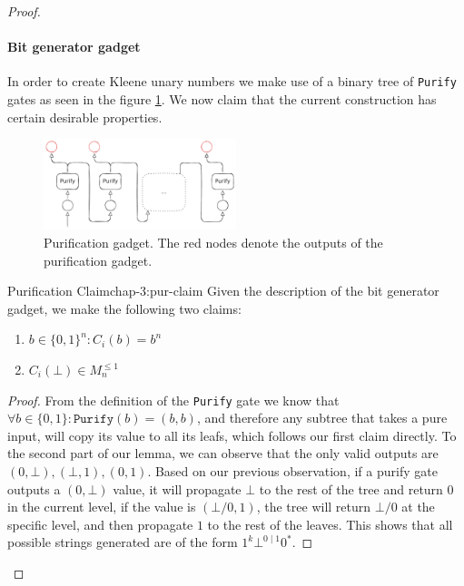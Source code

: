 \begin{proof}
    \paragraph*{Bit generator gadget} In order to create Kleene unary numbers we make use of a binary tree of \texttt{Purify} gates
    as seen in the figure \ref{fig:chap-3:purification-gadget}. We now claim that the current construction has certain desirable properties.


    \begin{figure}[h!]
        \centering %
        \includegraphics[width=0.5\textwidth]{Chapter3/purification-stage-construction.pdf}
        \caption{Purification gadget. The red nodes denote the outputs of the purification gadget.}
        \label{fig:chap-3:purification-gadget}
    \end{figure}

    \begin{claimbox}{Purification Claim}{chap-3:pur-claim}
        \label{clm:chap-3:pur-claim}
        Given the description of the bit generator gadget, we make the following two claims:
        \begin{enumerate}
            \item $b \in \{0,1\}^n: C_i(b) = b^n$
            \item $C_i(\bot) \in M^{\leq 1}_n$
        \end{enumerate}
    \end{claimbox}
    \begin{proof}
        From the definition of the \texttt{Purify} gate we know that
        $\forall b \in \{0,1\}: \texttt{Purify}(b) = (b,b)$, and therefore any subtree that takes a pure input, will copy its value
        to all its leafs, which follows our first claim directly. To the second part of our lemma, we can observe that
        the only valid outputs are $(0, \bot), (\bot,1), (0,1)$. Based on our previous observation, if a purify gate outputs
        a $(0, \bot)$ value, it will propagate $\bot$ to the rest of the tree and return $0$ in the current level,
        if the value is $(\bot/0, 1)$, the tree will return $\bot/0$ at the specific level, and then propagate $1$ to the rest of the leaves.
        This shows that all possible strings generated are of the form $1^k\bot^{0 \mid 1}0^{*}$.
    \end{proof}



\end{proof}
